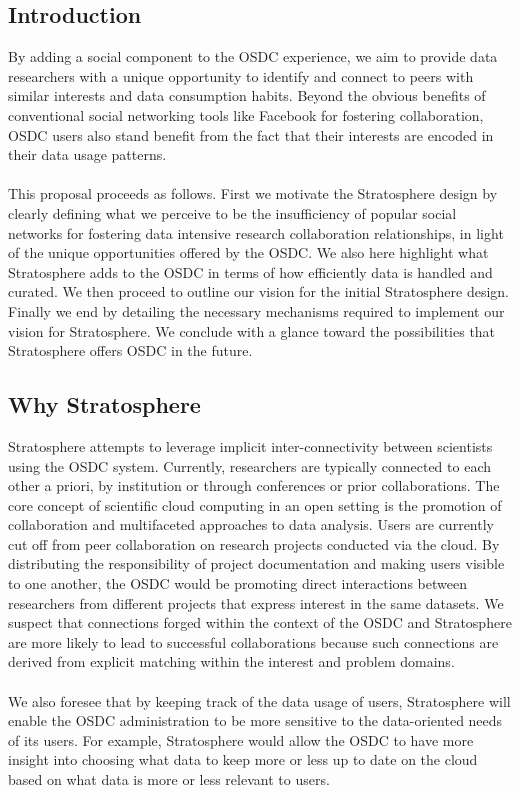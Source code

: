 \tableofcontents
\newpage
\begin{multicols*}{2}

\section{Introduction}
\label{sec:intro}

By adding a social component to the OSDC experience, we aim to provide
data researchers with a unique opportunity to identify and connect to
peers with similar interests and data consumption habits. Beyond the
obvious benefits of conventional social networking tools like Facebook
for fostering collaboration, OSDC users also stand benefit from the
fact that their interests are encoded in their data usage patterns.
\\
\\
This proposal proceeds as follows. First we motivate
the Stratosphere design by clearly defining what we perceive to be the
insufficiency of popular social networks for fostering data intensive
research collaboration relationships, in light of the unique
opportunities offered by the OSDC. We also here highlight what
Stratosphere adds to the OSDC in terms of how efficiently data is handled
and curated. We then proceed to outline our
vision for the initial Stratosphere design. Finally we end by
detailing the necessary mechanisms required to implement our
vision for Stratosphere. We conclude with a glance toward the
possibilities that Stratosphere offers OSDC in the future. 

\subsection{Why Stratosphere}
\label{sec:why}

Stratosphere attempts to leverage implicit inter-connectivity between
scientists using the OSDC system. Currently, researchers are typically
connected to each other a priori, by institution or through
conferences or prior collaborations. The core concept of scientific
cloud computing in an open setting is the promotion of collaboration
and multifaceted approaches to data analysis. Users are currently cut
off from peer collaboration on research projects conducted via the
cloud. By distributing the responsibility of project documentation and
making users visible to one another, the OSDC would be promoting
direct interactions between researchers from different projects that
express interest in the same datasets. We suspect that connections
forged within the context of the OSDC and Stratosphere are more likely
to lead to successful collaborations because such connections are
derived from explicit matching within the interest and problem
domains.
\\
\\
We also foresee that by keeping track of the data usage of users,
Stratosphere will enable the OSDC administration to be more sensitive
to the data-oriented needs of its users. For example, Stratosphere
would allow the OSDC to have more insight into choosing what data to
keep more or less up to date on the cloud based on what data is more
or less relevant to users.  


\end{multicols*}
